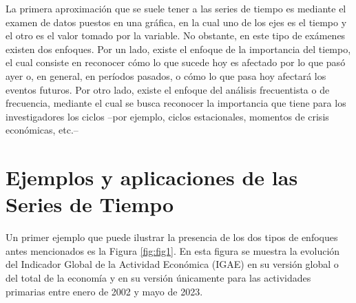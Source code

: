 \documentclass[
]{book}
\begin{document}
La primera aproximación que se suele tener a las series de tiempo es mediante el examen de datos puestos en una gráfica, en la cual uno de los ejes es el tiempo y el otro es el valor tomado por la variable. No obstante, en este tipo de exámenes existen dos enfoques. Por un lado, existe el enfoque de la importancia del tiempo, el cual consiste en reconocer cómo lo que sucede hoy es afectado por lo que pasó ayer o, en general, en períodos pasados, o cómo lo que pasa hoy afectará los eventos futuros. Por otro lado, existe el enfoque del análisis frecuentista o de frecuencia, mediante el cual se busca reconocer la importancia que tiene para los investigadores los ciclos --por ejemplo, ciclos estacionales, momentos de crisis económicas, etc.--

\hypertarget{ejemplos-y-aplicaciones-de-las-series-de-tiempo}{%
\section{Ejemplos y aplicaciones de las Series de Tiempo}\label{ejemplos-y-aplicaciones-de-las-series-de-tiempo}}

Un primer ejemplo que puede ilustrar la presencia de los dos tipos de
enfoques antes mencionados es la Figura \ref{fig:fig1}. En esta figura se muestra la evolución del Indicador Global de la Actividad Económica (IGAE) en su versión global o del total de la economía y en su versión únicamente para las actividades primarias entre enero de 2002 y mayo de 2023.
\end{document}
